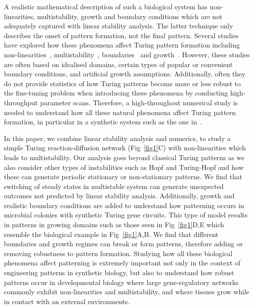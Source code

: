 \documentclass[10pt,letterpaper]{article}
\begin{document}
A realistic mathematical description of such a biological system has non-linearities, multistability, growth and boundary conditions which are not adequately captured with linear stability analysis. The latter technique only describes the onset of pattern formation, not the final pattern.
Several studies have explored how these phenomena affect Turing pattern formation including non-linearities~\parencite{ermentrout1991stripes}, multistability~\parencite{Krause2023}, boundaries~\parencite{Arcuri1986,Maini1993, Maini1997,Krause2020, Krause2021, Woolley2022} and growth~\parencite{gaffney2010, Klika2017, Krause2019}.
However, these studies are often based on idealised domains, certain types of popular or convenient boundary conditions, and artificial growth assumptions.
Additionally, often they do not provide statistics of how Turing patterns become more or less robust to the fine-tuning problem when introducing these phenomena by conducting high-throughput parameter scans.
Therefore, a high-throughout numerical study is needed to understand how all these natural phenomena affect Turing pattern formation, in particular in a synthetic system such as the one in~\cite{Oliver2023}.

In this paper, we combine linear stability analysis and numerics, to study a simple Turing reaction-diffusion network (Fig~\ref{fig1}C) with non-linearities which leads to multistability.
Our analysis goes beyond classical Turing patterns as we also consider other types of instabilities such as Hopf and Turing-Hopf and how these can generate periodic stationary or non-stationary patterns.
We find that switching of steady states in multistable system can generate unexpected outcomes not predicted by linear stability analysis.
Additionally, growth and realistic boundary conditions are added to understand how patterning occurs in microbial colonies with synthetic Turing gene circuits. This type of model results in patterns in growing domains such as those seen in Fig~\ref{fig1}D,E which resemble the biological example in Fig~\ref{fig1}A,B. 
We find that different boundaries and growth regimes can break or form patterns, therefore adding or removing robustness to pattern formation.
Studying how all these biological phenomena affect patterning is extremely important not only in the context of engineering patterns in synthetic biology, but also to understand how robust patterns occur in developmental biology where large gene-regulatory networks commonly exhibit non-linearities and multistability, and where tissues grow while in contact with an external environments.
\end{document}
